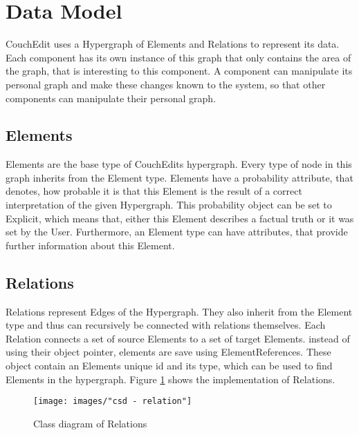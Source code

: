 \section{Data Model}
CouchEdit uses a Hypergraph of Elements and Relations to represent its data. Each component has its own instance of this graph that only contains the area of the graph, that is interesting to this component. A component can manipulate its personal graph and make these changes known to the system, so that other components can manipulate their personal graph.


\subsection{Elements}
Elements are the base type of CouchEdits hypergraph. Every type of node in this graph inherits from the Element type. Elements have a probability attribute, that denotes, how probable it is that this Element is the result of a correct interpretation of the given Hypergraph. This probability object can be set to Explicit, which means that, either this Element describes a factual truth or it was set by the User. Furthermore, an Element type can have attributes, that provide further information about this Element.



\subsection{Relations}
Relations represent Edges of the Hypergraph. They also inherit from the Element type and thus can recursively be connected with relations themselves. Each Relation connects a set of source Elements to a set of target Elements. instead of using their object pointer, elements are save using ElementReferences. These object contain an Elements unique id and its type, which can be used to find Elements in the hypergraph. Figure \ref{fig:relations} shows the implementation of Relations. 

\begin{figure}
  \centering
  \texttt{[image: images/"csd - relation"]}
  \caption{Class diagram of Relations}
  \label{fig:relations}
\end{figure}

